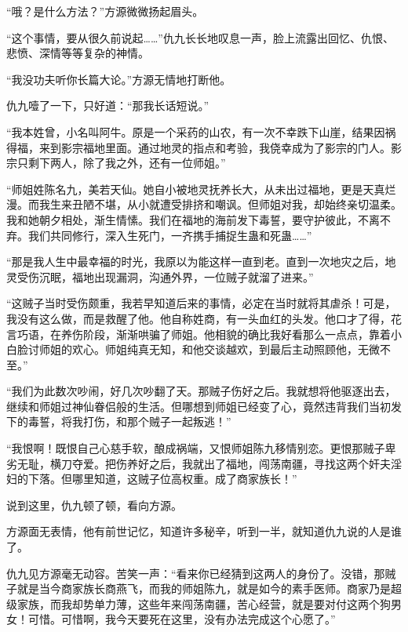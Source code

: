 
\begin{this_body}

“哦？是什么方法？”方源微微扬起眉头。

“这个事情，要从很久前说起……”仇九长长地叹息一声，脸上流露出回忆、仇恨、悲愤、深情等等复杂的神情。

“我没功夫听你长篇大论。”方源无情地打断他。

仇九噎了一下，只好道：“那我长话短说。”

“我本姓曾，小名叫阿牛。原是一个采药的山农，有一次不幸跌下山崖，结果因祸得福，来到影宗福地里面。通过地灵的指点和考验，我侥幸成为了影宗的门人。影宗只剩下两人，除了我之外，还有一位师姐。”

“师姐姓陈名九，美若天仙。她自小被地灵抚养长大，从未出过福地，更是天真烂漫。而我生来丑陋不堪，从小就遭受排挤和嘲讽。但师姐对我，却始终亲切温柔。我和她朝夕相处，渐生情愫。我们在福地的海前发下毒誓，要守护彼此，不离不弃。我们共同修行，深入生死门，一齐携手捕捉生蛊和死蛊……”

“那是我人生中最幸福的时光，我原以为能这样一直到老。直到一次地灾之后，地灵受伤沉眠，福地出现漏洞，沟通外界，一位贼子就溜了进来。”

“这贼子当时受伤颇重，我若早知道后来的事情，必定在当时就将其虐杀！可是，我没有这么做，而是救醒了他。他自称姓商，有一头血红的头发。他口才了得，花言巧语，在养伤阶段，渐渐哄骗了师姐。他相貌的确比我好看那么一点点，靠着小白脸讨师姐的欢心。师姐纯真无知，和他交谈越欢，到最后主动照顾他，无微不至。”

“我们为此数次吵闹，好几次吵翻了天。那贼子伤好之后。我就想将他驱逐出去，继续和师姐过神仙眷侣般的生活。但哪想到师姐已经变了心，竟然违背我们当初发下的毒誓，将我打伤，和那个贼子一起叛逃！”

“我恨啊！既恨自己心慈手软，酿成祸端，又恨师姐陈九移情别恋。更恨那贼子卑劣无耻，横刀夺爱。把伤养好之后，我就出了福地，闯荡南疆，寻找这两个奸夫淫妇的下落。但哪里知道，这贼子位高权重。成了商家族长！”

说到这里，仇九顿了顿，看向方源。

方源面无表情，他有前世记忆，知道许多秘辛，听到一半，就知道仇九说的人是谁了。

仇九见方源毫无动容。苦笑一声：“看来你已经猜到这两人的身份了。没错，那贼子就是当今商家族长商燕飞，而我的师姐陈九，就是如今的素手医师。商家乃是超级家族，而我却势单力薄，这些年来闯荡南疆，苦心经营，就是要对付这两个狗男女！可惜。可惜啊，我今天要死在这里，没有办法完成这个心愿了。”


\end{this_body}
